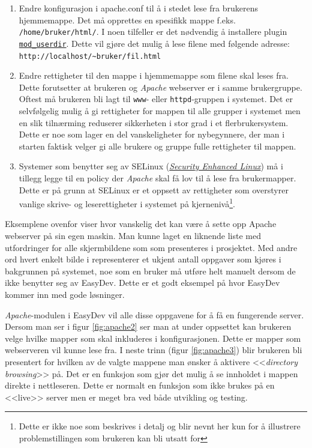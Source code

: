 \begin{enumerate}
\item Endre konfigurasjon i apache.conf til å i stedet lese fra brukerens hjemmemappe. Det må opprettes en spesifikk mappe f.eks. \texttt{/home/bruker/html/}. 
I noen tilfeller er det nødvendig å installere plugin \href{http://httpd.apache.org/docs/2.2/mod/mod_userdir.html}{\texttt{mod\_{}userdir}}. Dette vil gjøre det mulig å lese filene med følgende adresse: \texttt{http://localhost/\~{}bruker/fil.html}

\item Endre rettigheter til den mappe i hjemmemappe som filene skal leses fra. Dette forutsetter at brukeren og \textit{Apache} webserver er i samme brukergruppe. Oftest må brukeren bli lagt til \texttt{www}- eller \texttt{httpd}-gruppen i systemet. Det er selvfølgelig mulig å gi rettigheter for mappen til alle grupper i systemet men en slik tilnærming reduserer sikkerheten i stor grad i et flerbrukersystem. Dette er noe som lager en del vanskeligheter for nybegynnere, der man i starten faktisk velger gi alle brukere og gruppe fulle  rettigheter til mappen. 

\item Systemer som benytter seg av SELinux (\href{http://en.wikipedia.org/wiki/Security-Enhanced_Linux}{\textit{Security Enhanced Linux}}) må i tillegg legge til en policy der \textit{Apache} skal få lov til å lese fra brukermapper. Dette er på grunn at SELinux er et oppsett av rettigheter som overstyrer vanlige skrive- og leserettigheter i systemet på kjernenivå\footnote{Dette er ikke noe som beskrives i detalj og blir nevnt her kun for å illustrere problemstillingen som brukeren kan bli utsatt for}. 
\end{enumerate}

Eksemplene ovenfor viser hvor vanskelig det kan være å sette opp Apache webserver på sin egen maskin. Man kunne laget en liknende liste med utfordringer for alle skjermbildene som som presenteres i prosjektet. Med andre ord hvert enkelt bilde i representerer et ukjent antall oppgaver som kjøres i bakgrunnen på systemet, noe som en bruker må utføre helt manuelt dersom de ikke benytter seg av EasyDev.
Dette er et godt eksempel på hvor EasyDev kommer inn med gode løsninger. 

\textit{Apache}-modulen i EasyDev vil alle disse oppgavene for å få en fungerende server.
Dersom man ser i figur \ref{fig:apache2} ser man at under oppsettet kan brukeren velge hvilke mapper som skal inkluderes i konfigurasjonen. Dette er mapper som webserveren vil kunne lese fra. 
I neste trinn (figur \ref{fig:apache3}) blir brukeren bli presentert for hvilken av de valgte mappene man ønsker å aktivere <<\textit{directory browsing}>> på. Det er en funksjon som gjør det mulig å se innholdet i mappen direkte i nettleseren. Dette er normalt en funksjon som ikke brukes på en <<live>> server men er meget bra ved både utvikling og testing.
 
